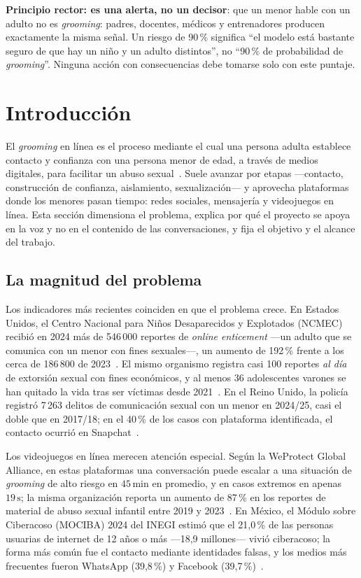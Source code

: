 \documentclass[11pt,a4paper]{article}
\newcommand{\gr}{\emph{grooming}}
\begin{document}
\noindent\textbf{Principio rector: es una alerta, no un decisor}: que un menor hable con un adulto no es \gr{}: padres, docentes, médicos y entrenadores producen exactamente la misma señal. Un riesgo de 90\,\% significa ``el modelo está bastante seguro de que hay un niño y un adulto distintos'', no ``90\,\% de probabilidad de \gr{}''. Ninguna acción con consecuencias debe tomarse solo con este puntaje.

\section{Introducción}

El \gr{} en línea es el proceso mediante el cual una persona adulta establece contacto y confianza con una persona menor de edad, a través de medios digitales, para facilitar un abuso sexual~\cite{whittle2013}. Suele avanzar por etapas ---contacto, construcción de confianza, aislamiento, sexualización--- y aprovecha plataformas donde los menores pasan tiempo: redes sociales, mensajería y videojuegos en línea. Esta sección dimensiona el problema, explica por qué el proyecto se apoya en la voz y no en el contenido de las conversaciones, y fija el objetivo y el alcance del trabajo.

\subsection{La magnitud del problema}

Los indicadores más recientes coinciden en que el problema crece. En Estados Unidos, el Centro Nacional para Niños Desaparecidos y Explotados (NCMEC) recibió en 2024 más de 546\,000 reportes de \emph{online enticement} ---un adulto que se comunica con un menor con fines sexuales---, un aumento de 192\,\% frente a los cerca de 186\,800 de 2023~\cite{ncmec2025,thorn2025}. El mismo organismo registra casi 100 reportes \emph{al día} de extorsión sexual con fines económicos, y al menos 36 adolescentes varones se han quitado la vida tras ser víctimas desde 2021~\cite{ncmec2025}. En el Reino Unido, la policía registró 7\,263 delitos de comunicación sexual con un menor en 2024/25, casi el doble que en 2017/18; en el 40\,\% de los casos con plataforma identificada, el contacto ocurrió en Snapchat~\cite{nspcc2025}.

Los videojuegos en línea merecen atención especial. Según la WeProtect Global Alliance, en estas plataformas una conversación puede escalar a una situación de \gr{} de alto riesgo en $45\,\mathrm{min}$ en promedio, y en casos extremos en apenas $19\,\mathrm{s}$; la misma organización reporta un aumento de 87\,\% en los reportes de material de abuso sexual infantil entre 2019 y 2023~\cite{weprotect2023}. En México, el Módulo sobre Ciberacoso (MOCIBA) 2024 del INEGI estimó que el 21,0\,\% de las personas usuarias de internet de 12 años o más ---18,9 millones--- vivió ciberacoso; la forma más común fue el contacto mediante identidades falsas, y los medios más frecuentes fueron WhatsApp (39,8\,\%) y Facebook (39,7\,\%)~\cite{inegi2025}.
\end{document}
